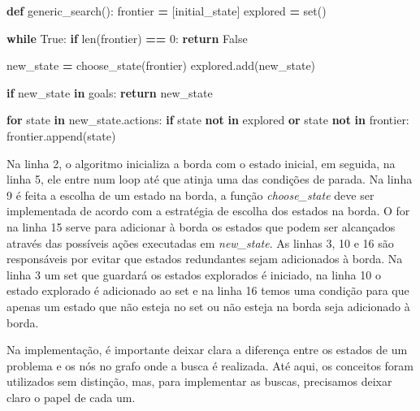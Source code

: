 \documentclass[brazil,]{article}
\newenvironment{Shaded}{\begin{snugshade}}{\end{snugshade}}
\newcommand{\KeywordTok}[1]{\textcolor[rgb]{0.13,0.29,0.53}{\textbf{#1}}}
\newcommand{\DecValTok}[1]{\textcolor[rgb]{0.00,0.00,0.81}{#1}}
\newcommand{\VariableTok}[1]{\textcolor[rgb]{0.00,0.00,0.00}{#1}}
\newcommand{\ControlFlowTok}[1]{\textcolor[rgb]{0.13,0.29,0.53}{\textbf{#1}}}
\newcommand{\OperatorTok}[1]{\textcolor[rgb]{0.81,0.36,0.00}{\textbf{#1}}}
\newcommand{\BuiltInTok}[1]{#1}
\newcommand{\NormalTok}[1]{#1}
\begin{document}
\hypertarget{mycode}{\label{mycode}}
\begin{Shaded}
\begin{Highlighting}[numbers=left,,]
\KeywordTok{def}\NormalTok{ generic_search():}
\NormalTok{    frontier }\OperatorTok{=}\NormalTok{ [initial_state]}
\NormalTok{    explored }\OperatorTok{=} \BuiltInTok{set}\NormalTok{()}

    \ControlFlowTok{while} \VariableTok{True}\NormalTok{:}
        \ControlFlowTok{if} \BuiltInTok{len}\NormalTok{(frontier) }\OperatorTok{==} \DecValTok{0}\NormalTok{:}
            \ControlFlowTok{return} \VariableTok{False}

\NormalTok{        new_state }\OperatorTok{=}\NormalTok{ choose_state(frontier)}
\NormalTok{        explored.add(new_state)}

        \ControlFlowTok{if}\NormalTok{ new_state }\KeywordTok{in}\NormalTok{ goals:}
            \ControlFlowTok{return}\NormalTok{ new_state}

        \ControlFlowTok{for}\NormalTok{ state }\KeywordTok{in}\NormalTok{ new_state.actions:}
            \ControlFlowTok{if}\NormalTok{ state }\KeywordTok{not} \KeywordTok{in}\NormalTok{ explored }\KeywordTok{or}\NormalTok{ state }\KeywordTok{not} \KeywordTok{in}\NormalTok{ frontier:}
\NormalTok{                frontier.append(state)}
\end{Highlighting}
\end{Shaded}

Na linha 2, o algoritmo inicializa a borda com o estado inicial, em
seguida, na linha 5, ele entre num loop até que atinja uma das condições
de parada. Na linha 9 é feita a escolha de um estado na borda, a função
\emph{choose\_state} deve ser implementada de acordo com a estratégia de
escolha dos estados na borda. O for na linha 15 serve para adicionar à
borda os estados que podem ser alcançados através das possíveis ações
executadas em \emph{new\_state}. As linhas 3, 10 e 16 são responsáveis
por evitar que estados redundantes sejam adicionados à borda. Na linha 3
um set que guardará os estados explorados é iniciado, na linha 10 o
estado explorado é adicionado ao set e na linha 16 temos uma condição
para que apenas um estado que não esteja no set ou não esteja na borda
seja adicionado à borda.

Na implementação, é importante deixar clara a diferença entre os estados
de um problema e os nós no grafo onde a busca é realizada. Até aqui, os
conceitos foram utilizados sem distinção, mas, para implementar as
buscas, precisamos deixar claro o papel de cada um.
\end{document}
